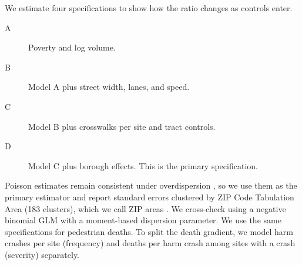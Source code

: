 \documentclass[10pt,twocolumn]{article}
\begin{document}
We estimate four specifications to show how the ratio changes as controls enter.
\begin{description}
\item[A] Poverty and log volume.
\item[B] Model A plus street width, lanes, and speed.
\item[C] Model B plus crosswalks per site and tract controls.
\item[D] Model C plus borough effects. This is the primary specification.
\end{description}
Poisson estimates remain consistent under overdispersion \citep{santossilva2006log}, so we use them as the primary estimator and report standard errors clustered by ZIP Code Tabulation Area (183 clusters), which we call ZIP areas \citep{cameron2015practitioner}. We cross-check using a negative binomial GLM with a moment-based dispersion parameter. We use the same specifications for pedestrian deaths. To split the death gradient, we model harm crashes per site (frequency) and deaths per harm crash among sites with a crash (severity) separately.
\end{document}

